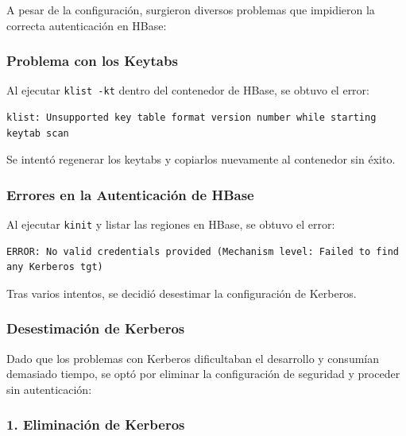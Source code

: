 \documentclass{article}
\begin{document}
\subsubsection{}
A pesar de la configuración, surgieron diversos problemas que impidieron la correcta autenticación en HBase:

\vspace{5mm}

\subsubsection{Problema con los Keytabs}

Al ejecutar \texttt{klist -kt} dentro del contenedor de HBase, se obtuvo el error:

\begin{lstlisting}[style=bashStyle]
klist: Unsupported key table format version number while starting keytab scan
\end{lstlisting}


Se intentó regenerar los keytabs y copiarlos nuevamente al contenedor sin éxito.

\vspace{5mm}


\subsubsection{Errores en la Autenticación de HBase}

Al ejecutar \texttt{kinit} y listar las regiones en HBase, se obtuvo el error:

\begin{verbatim}
ERROR: No valid credentials provided (Mechanism level: Failed to find any Kerberos tgt)
\end{verbatim}

Tras varios intentos, se decidió desestimar la configuración de Kerberos.

\subsubsection{Desestimación de Kerberos}
Dado que los problemas con Kerberos dificultaban el desarrollo y consumían demasiado tiempo, se optó por eliminar la configuración de seguridad y proceder sin autenticación:

\vspace{5mm}

\subsubsection{1. Eliminación de Kerberos}
\end{document}
